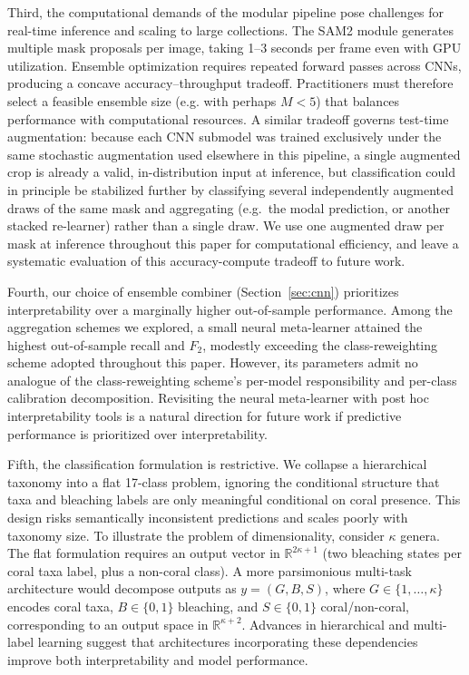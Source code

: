 \documentclass[11pt]{elsarticle}
\begin{document}
Third, the computational demands of the modular pipeline pose challenges for real-time inference and scaling to large collections. The SAM2 module generates multiple mask proposals per image, taking 1--3 seconds per frame even with GPU utilization. Ensemble optimization requires repeated forward passes across CNNs, producing a concave accuracy--throughput tradeoff. Practitioners must therefore select a feasible ensemble size (e.g. with perhaps $M<5$) that balances performance with computational resources. A similar tradeoff governs test-time augmentation: because each CNN submodel was trained exclusively under the same stochastic augmentation used elsewhere in this pipeline, a single augmented crop is already a valid, in-distribution input at inference, but classification could in principle be stabilized further by classifying several independently augmented draws of the same mask and aggregating (e.g.\ the modal prediction, or another stacked re-learner) rather than a single draw. We use one augmented draw per mask at inference throughout this paper for computational efficiency, and leave a systematic evaluation of this accuracy-compute tradeoff to future work.

Fourth, our choice of ensemble combiner (Section~\ref{sec:cnn}) prioritizes interpretability over a marginally higher out-of-sample performance. Among the aggregation schemes we explored, a small neural meta-learner attained the highest out-of-sample recall and $F_2$, modestly exceeding the class-reweighting scheme adopted throughout this paper. However, its parameters admit no analogue of the class-reweighting scheme's per-model responsibility and per-class calibration decomposition. Revisiting the neural meta-learner with post hoc interpretability tools is a natural direction for future work if predictive performance is prioritized over interpretability.

Fifth, the classification formulation is restrictive. We collapse a hierarchical taxonomy into a flat 17-class problem, ignoring the conditional structure that taxa and bleaching labels are only meaningful conditional on coral presence. This design risks semantically inconsistent predictions and scales poorly with taxonomy size. To illustrate the problem of dimensionality, consider $\kappa$ genera. The flat formulation requires an output vector in $\mathbb{R}^{2\kappa+1}$ (two bleaching states per coral taxa label, plus a non-coral class). A more parsimonious multi-task architecture would decompose outputs as $y = (G,B,S)$, where $G \in \{1,\ldots,\kappa\}$ encodes coral taxa, $B \in \{0,1\}$ bleaching, and $S \in \{0,1\}$ coral/non-coral, corresponding to an output space in $\mathbb{R}^{\kappa+2}$.%
Advances in hierarchical and multi-label learning \citep{wehrmann2018hierarchical, deng2014large, wang2016cnn, nam2014large} suggest that architectures incorporating these dependencies improve both interpretability and model performance.
\end{document}
